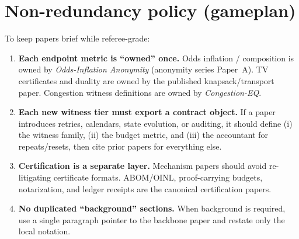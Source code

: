 \documentclass[11pt]{article}
\begin{document}
\section{Non-redundancy policy (gameplan)}
To keep papers brief while referee-grade:
\begin{enumerate}[leftmargin=*]
\item \textbf{Each endpoint metric is ``owned'' once.}
  Odds inflation / composition is owned by \emph{Odds-Inflation Anonymity} (anonymity series Paper~A).
  TV certificates and duality are owned by the published knapsack/transport paper.
  Congestion witness definitions are owned by \emph{Congestion-EQ}.
\item \textbf{Each new witness tier must export a contract object.}
  If a paper introduces retries, calendars, state evolution, or auditing, it should define (i) the witness family, (ii) the budget metric, and (iii) the accountant for repeats/resets,
  then cite prior papers for everything else.
\item \textbf{Certification is a separate layer.}
  Mechanism papers should avoid re-litigating certificate formats.
  ABOM/OINL, proof-carrying budgets, notarization, and ledger receipts are the canonical certification papers.
\item \textbf{No duplicated ``background'' sections.}
  When background is required, use a single paragraph pointer to the backbone paper and restate only the local notation.
\end{enumerate}
\end{document}
